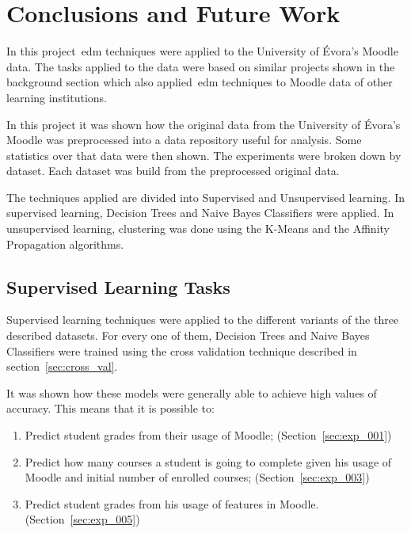 \chapter{Conclusions and Future Work}
\label{sec:final}

In this project~\gls{edm} techniques were applied to the University of Évora's
Moodle data. The tasks applied to the data were based on similar projects shown
in the background section which also applied~\gls{edm} techniques to Moodle
data of other learning institutions.

In this project it was shown how the original data from the University of
Évora's Moodle was preprocessed into a data repository useful for analysis.
Some statistics over that data were then shown. The experiments were broken
down by dataset. Each dataset was build from the preprocessed original data.

The techniques applied are divided into Supervised and Unsupervised learning.
In supervised learning, Decision Trees and Naive Bayes Classifiers were
applied. In unsupervised learning, clustering was done using the K-Means and
the Affinity Propagation algorithms.

\section{Supervised Learning Tasks}

Supervised learning techniques were applied to the different variants of the
three described datasets. For every one of them, Decision Trees and Naive Bayes
Classifiers were trained using the cross validation technique described in
section~\ref{sec:cross_val}.

It was shown how these models were generally able to achieve high values of
accuracy. This means that it is possible to:

\begin{enumerate}
    \item Predict student grades from their usage of Moodle;
        (Section~\ref{sec:exp_001})
    \item Predict how many courses a student is going to complete given his
        usage of Moodle and initial number of enrolled courses;
        (Section~\ref{sec:exp_003})
    \item Predict student grades from his usage of features in Moodle.
        (Section~\ref{sec:exp_005})
\end{enumerate}

